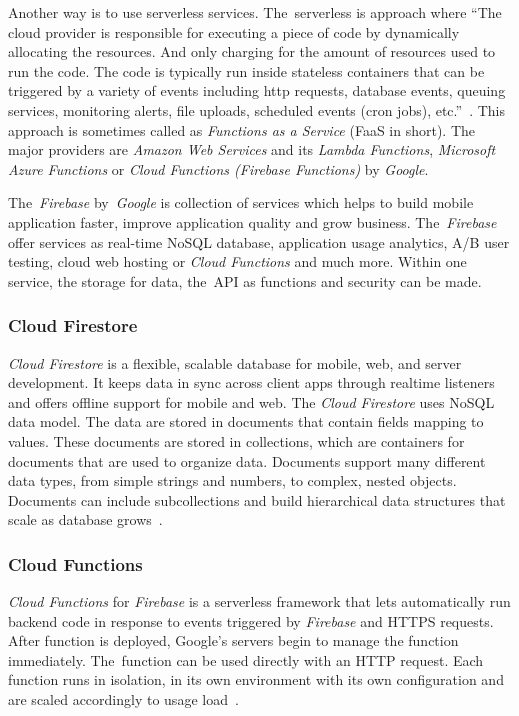 Another way is to use serverless services. The~serverless is approach where ``The cloud provider is responsible for executing a piece of code by dynamically allocating the resources. And only charging for the amount of resources used to run the code. The code is typically run inside stateless containers that can be triggered by a variety of events including http requests, database events, queuing services, monitoring alerts, file uploads, scheduled events (cron jobs), etc.''~\cite{what-is-serverless}. This approach is sometimes called as \textit{Functions as a Service} (FaaS in short). The major providers are \textit{Amazon Web Services} and its \textit{Lambda Functions}, \textit{Microsoft Azure Functions} or \textit{Cloud Functions (Firebase Functions)} by \textit{Google}. 

The~\textit{Firebase} by~\textit{Google} is collection of services which helps to build mobile application faster, improve application quality and grow business. The~\textit{Firebase} offer services as real-time NoSQL database, application usage analytics, A/B user testing, cloud web hosting or \textit{Cloud Functions} and much more. Within one service, the storage for data, the~API as functions and security can be made. 
\subsubsection{Cloud Firestore}
\textit{Cloud Firestore} is a flexible, scalable database for mobile, web, and server development. It keeps data in sync across client apps through realtime listeners and offers offline support for mobile and web. The \textit{Cloud Firestore} uses NoSQL data model. The data are stored in documents that contain fields mapping to values. These documents are stored in collections, which are containers for documents that are used to organize data. Documents support many different data types, from simple strings and numbers, to complex, nested objects. Documents can include subcollections and build hierarchical data structures that scale as database grows~\cite{cloud-firestore}.
\subsubsection{Cloud Functions}
\textit{Cloud Functions} for \textit{Firebase} is a serverless framework that lets automatically run backend code in response to events triggered by \textit{Firebase} and HTTPS requests. After function is deployed, Google's servers begin to manage the function immediately. The~function can be used directly with an HTTP request. Each function runs in isolation, in its own environment with its own configuration and are scaled accordingly to usage load~\cite{cloud-functions}. 
